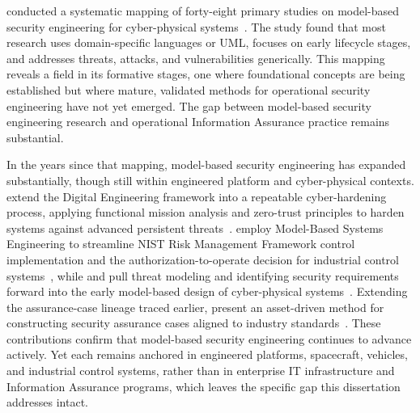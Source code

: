 \citeauthor{Nguyen_Ali_Yue_2017} conducted a systematic mapping of forty-eight primary studies on model-based security engineering for cyber-physical systems~\parencite{Nguyen_Ali_Yue_2017}. The study found that most research uses domain-specific languages or UML, focuses on early lifecycle stages, and addresses threats, attacks, and vulnerabilities generically. This mapping reveals a field in its formative stages, one where foundational concepts are being established but where mature, validated methods for operational security engineering have not yet emerged. The gap between model-based security engineering research and operational Information Assurance practice remains substantial.

In the years since that mapping, model-based security engineering has expanded substantially, though still within engineered platform and cyber-physical contexts. \citeauthor{Mitola_Prys_2024} extend the Digital Engineering framework into a repeatable cyber-hardening process, applying functional mission analysis and zero-trust principles to harden systems against advanced persistent threats~\parencite{Mitola_Prys_2024}. \citeauthor{Gampel_Eveleigh_2025} employ Model-Based Systems Engineering to streamline NIST Risk Management Framework control implementation and the authorization-to-operate decision for industrial control systems~\parencite{Gampel_Eveleigh_2025}, while \citeauthor{Larsen_2024} and \citeauthor{Nolte_2025} pull threat modeling and identifying security requirements forward into the early model-based design of cyber-physical systems~\parencite{Larsen_2024, Nolte_2025}. Extending the assurance-case lineage traced earlier, \citeauthor{Mohamad_CASCADE_2023} present an asset-driven method for constructing security assurance cases aligned to industry standards~\parencite{Mohamad_CASCADE_2023}. These contributions confirm that model-based security engineering continues to advance actively. Yet each remains anchored in engineered platforms, spacecraft, vehicles, and industrial control systems, rather than in enterprise IT infrastructure and Information Assurance programs, which leaves the specific gap this dissertation addresses intact.

